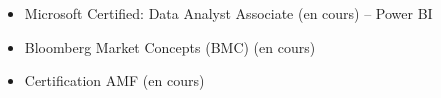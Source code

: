 \begin{itemize}
    \item Microsoft Certified: Data Analyst Associate (en cours) – Power BI
    \item Bloomberg Market Concepts (BMC) (en cours)
    \item Certification AMF (en cours)
\end{itemize}
